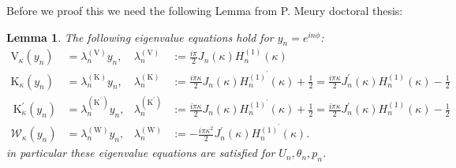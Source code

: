 \documentclass[10pt,journal,compsoc, onecolumn]{IEEEtran}
\newtheorem{lemma}[theorem]{Lemma}
\begin{document}
Before we proof this we need the following Lemma from P. Meury doctoral thesis: 
\begin{lemma}
    The following eigenvalue equations hold for $y_n = e^{i n \phi}$:
    $$
    \begin{aligned} 
        \mathrm{V}_{\kappa}\left(y_{n}\right) &=\lambda_{n}^{(\mathrm{V})} y_{n}, & \lambda_{n}^{(\mathrm{V})} &:=\frac{i \pi}{2} J_{n}(\kappa) H_{n}^{(1)}(\kappa) \\ 
        \mathrm{K}_{\kappa}\left(y_{n}\right) &=\lambda_{n}^{(\mathrm{K})} y_{n}, & \lambda_{n}^{(\mathrm{K})} &:=\frac{i \pi \kappa}{2} J_{n}(\kappa) H_{n}^{(1)^{\prime}}(\kappa)+\frac{1}{2}=\frac{i \pi \kappa}{2} J_{n}^{\prime}(\kappa) H_{n}^{(1)}(\kappa)-\frac{1}{2} \\ 
        \mathrm{~K}_{\kappa}^{\prime}\left(y_{n}\right) &=\lambda_{n}^{\left(\mathrm{K}^{\prime}\right)} y_{n}, & \lambda_{n}^{\left(\mathrm{K}^{\prime}\right)} &:=\frac{i \pi \kappa}{2} J_{n}(\kappa) H_{n}^{(1)^{\prime}}(\kappa)+\frac{1}{2}=\frac{i \pi \kappa}{2} J_{n}^{\prime}(\kappa) H_{n}^{(1)}(\kappa)-\frac{1}{2} \\ 
        \mathcal{W}_{\kappa}\left(y_{n}\right) &=\lambda_{n}^{(\mathrm{W})} y_{n}, & \lambda_{n}^{(\mathrm{W})} &:= - \frac{i \pi \kappa^{2}}{2} J_{n}^{\prime}(\kappa) H_{n}^{(1)^{\prime}}(\kappa).
    \end{aligned}
    $$
    in particular these eigenvalue equations are satisfied for $U_n, \theta_n, p_n$.
\end{lemma}
   
\end{document}
